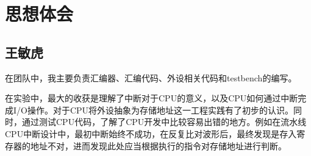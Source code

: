 \documentclass{ctexart}
\begin{document}
	\section{思想体会}

	\subsection{王敏虎}

	在团队中，我主要负责汇编器、汇编代码、外设相关代码和testbench的编写。

	在实验中，最大的收获是理解了中断对于CPU的意义，以及CPU如何通过中断完成I/O操作。对于CPU将外设抽象为存储地址这一工程实践有了初步的认识。同时，通过测试CPU代码，了解了CPU开发中比较容易出错的地方。例如在流水线CPU中断设计中，最初中断始终不成功，在反复比对波形后，最终发现是存入寄存器的地址不对，进而发现此处应当根据执行的指令对存储地址进行判断。
\end{document}
